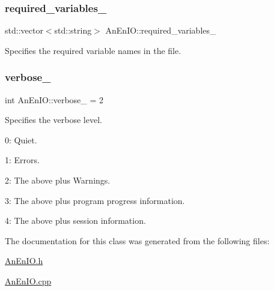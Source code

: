 \subsubsection{\texorpdfstring{required\+\_\+variables\+\_\+}{required\_variables\_}}
{\footnotesize\ttfamily std\+::vector$<$std\+::string$>$ An\+En\+I\+O\+::required\+\_\+variables\+\_\+\hspace{0.3cm}{\ttfamily [protected]}}

Specifies the required variable names in the file. \mbox{\label{class_an_en_i_o_a4f6abd007730e4a8f54d57cc3572bd9e}} 
\subsubsection{\texorpdfstring{verbose\+\_\+}{verbose\_}}
{\footnotesize\ttfamily int An\+En\+I\+O\+::verbose\+\_\+ = 2\hspace{0.3cm}{\ttfamily [protected]}}

Specifies the verbose level.
\begin{DoxyItemize}
\item 0\+: Quiet.
\item 1\+: Errors.
\item 2\+: The above plus Warnings.
\item 3\+: The above plus program progress information.
\item 4\+: The above plus session information. 
\end{DoxyItemize}

The documentation for this class was generated from the following files\+:\begin{DoxyCompactItemize}
\item 
\mbox{\hyperlink{_an_en_i_o_8h}{An\+En\+I\+O.\+h}}\item 
\mbox{\hyperlink{_an_en_i_o_8cpp}{An\+En\+I\+O.\+cpp}}\end{DoxyCompactItemize}
